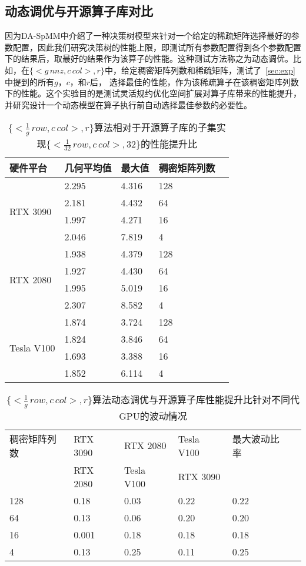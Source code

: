 \subsection{动态调优与开源算子库对比}\label{sec:overori}
因为DA-SpMM中介绍了一种决策树模型来针对一个给定的稀疏矩阵选择最好的参数配置，因此我们研究决策树的性能上限，即测试所有参数配置得到各个参数配置下的结果后，取最好的结果作为该算子的性能。这种测试方法称之为动态调优。比如，在$\{<g\,nnz , c\,col>,r\}$中，给定稠密矩阵列数和稀疏矩阵，测试了~\ref{sec:exp}中提到的所有$g$，$c$，和$r$后，
选择最佳的性能，作为该稀疏算子在该稠密矩阵列数下的性能。这个实验目的是测试灵活规约优化空间扩展对算子库带来的性能提升，并研究设计一个动态模型在算子执行前自动选择最佳参数的必要性。
\begin{table}
  \centering
  \caption{$\{<\frac{1}{g}\,row , c\,col>,r\}$算法相对于开源算子库的子集实现$\{<\frac{1}{32}\,row , c\,col>,32\}$的性能提升比}
  \begin{tabular}{lllll}
  \toprule
  硬件平台 & 几何平均值  & 最大值 & 稠密矩阵列数 \\
  \midrule
  \multirow{4}{*}{RTX 3090}& 2.295   & 4.316  & 128\\
                          & 2.181   & 4.432  & 64\\
                          & 1.997   & 4.271  & 16\\
                          & 2.046   & 7.819  & 4\\
  \hline
  \multirow{4}{*}{RTX 2080}& 1.938   & 4.379  & 128\\
                          & 1.927   & 4.430  & 64\\
                          & 1.995   & 5.019  & 16\\
                          & 2.307   & 8.582  & 4\\
  \hline
  \multirow{4}{*}{Tesla V100}   & 1.874   & 3.724  & 128\\
                          & 1.824   & 3.846  & 64\\
                          & 1.693   & 3.388  & 16\\
                          & 1.852   & 6.114  & 4\\
  \bottomrule
  \end{tabular}
  \label{tab:over-ori-rb}%
\end{table}
\begin{table}
  \centering
  \caption{$\{<\frac{1}{g}\,row , c\,col>,r\}$算法动态调优与开源算子库性能提升比针对不同代GPU的波动情况}
  \begin{tabular}{llllll}
  \toprule
  稠密矩阵列数 & RTX 3090 & RTX 2080   & Tesla V100 & 最大波动比率 \\
    & RTX 2080 & Tesla V100 & RTX 3090   &  \\
  \midrule
  128 & 0.18 & 0.03 & 0.22 & 0.22 \\
  64  & 0.13 & 0.06 & 0.20 & 0.20 \\
  16  & 0.001 & 0.18 & 0.18 & 0.18 \\
  4   & 0.13 & 0.25 & 0.11 & 0.25 \\
  \bottomrule
  \end{tabular}
  \label{tab:hw-rb}
\end{table}
